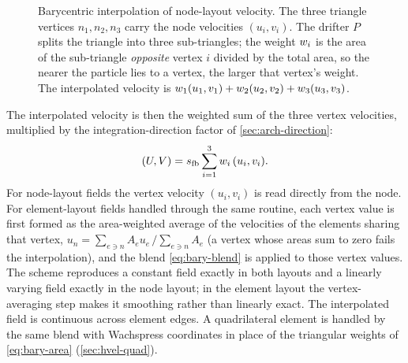\begin{figure}[t]
\centering
{}
\caption{Barycentric interpolation of node-layout velocity. The three triangle
vertices $n_1,n_2,n_3$ carry the node velocities $(u_i,v_i)$. The drifter $P$
splits the triangle into three sub-triangles; the weight $w_{i}$ is the area of
the sub-triangle \emph{opposite} vertex $i$ divided by the total area, so the
nearer the particle lies to a vertex, the larger that vertex's weight. The
interpolated velocity is $w_{1}(u_1,v_1)+w_{2}(u_2,v_2)+w_{3}(u_3,v_3)$.}
\label{fig:bary}
\end{figure}

The interpolated velocity is then the weighted sum of the three vertex velocities,
multiplied by the integration-direction factor of \cref{sec:arch-direction}:
\begin{equation}\label{eq:bary-blend}
  (U,V) = s_{\mathrm{fb}} \sum_{i=1}^{3} w_{i}\,(u_i,v_i).
\end{equation}
For node-layout fields the vertex velocity $(u_i,v_i)$ is read directly from the
node. For element-layout fields handled through the same routine, each vertex value
is first formed as the area-weighted average of the velocities of the elements
sharing that vertex, $u_n=\sum_{e\ni n}A_e u_e\,/\sum_{e\ni n}A_e$ (a vertex whose areas sum to zero
fails the interpolation), and the blend \cref{eq:bary-blend} is applied to those vertex values. The scheme reproduces a
constant field exactly in both layouts and a linearly varying field exactly in the
node layout; in the element layout the vertex-averaging step makes it
smoothing rather than linearly exact. The interpolated field is continuous across element edges.
A quadrilateral element is handled by the same blend with Wachspress coordinates
\citep{warren1996barycentric,floater2003mvc} in place of the triangular weights of
\cref{eq:bary-area} (\cref{sec:hvel-quad}).


